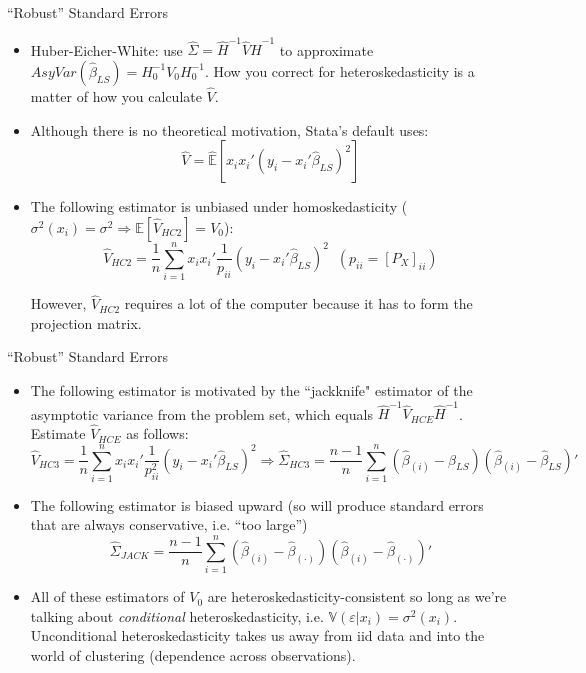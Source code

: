 \documentclass[fleqn, 10pt]{beamer}
\newcommand{\E}{\mathbb{E}}
\begin{document}
\begin{frame}{``Robust'' Standard Errors}
	
	\begin{itemize}
		\item Huber-Eicher-White: use \(\hat{\Sigma} = \hat{H}^{-1} \hat{V} \hat{H}^{-1} \) to approximate $AsyVar(\hat{\beta}_{LS})=H^{-1}_0V_0H^{-1}_0$. How you correct for heteroskedasticity is a matter of how you calculate \( \hat{V} \).
		\item Although there is no theoretical motivation, Stata's default uses:
		\[ \hat{V} = \hat{\E} [x_i x_i' (y_i - x_i' \hat{\beta}_{LS})^2] \]
		\item The following estimator is unbiased under homoskedasticity (\(\sigma^2(x_i) = \sigma^2 \Rightarrow \E[\hat{V}_{HC2}] = V_0 \)):
		\[ \hat{V}_{HC2} = \frac{1}{n} \sum_{i=1}^{n} x_i x_i' \frac{1}{p_{ii}} (y_i - x_i' \hat{\beta}_{LS})^2 \;\; (p_{ii} = [P_X]_{ii}) \]
		
		However, $\hat{V}_{HC2}$ requires a lot of the computer because it has to form the projection matrix. 
	\end{itemize}
	
\end{frame}

\begin{frame}{``Robust'' Standard Errors}
	
	\begin{itemize}
		\item The following estimator is motivated by the ``jackknife" estimator of the asymptotic variance from the problem set, which equals $\hat{H}^{-1}\hat{V}_{HCE}\hat{H}^{-1}$. Estimate $\hat{V}_{HCE}$ as follows:
		\[ \hat{V}_{HC3} = \frac{1}{n} \sum_{i=1}^{n} x_i x_i' \frac{1}{p_{ii}^2} (y_i - x_i' \hat{\beta}_{LS})^2 \Rightarrow \hat{\Sigma}_{HC3} = \frac{n-1}{n} \sum_{i=1}^n \left( \hat{\beta}_{(i)} - \hat{\beta}_{LS} \right) \left( \hat{\beta}_{(i)} - \hat{\beta}_{LS} \right)' \]
		\item The following estimator is biased upward (so will produce standard errors that are always conservative, i.e. ``too large'')
		\[ \hat{\Sigma}_{JACK} = \frac{n-1}{n} \sum_{i=1}^n \left( \hat{\beta}_{(i)} - \hat{\beta}_{(\cdot)} \right) \left( \hat{\beta}_{(i)} - \hat{\beta}_{(\cdot)} \right)' \]
		\item All of these estimators of $V_0$ are heteroskedasticity-consistent so long as we're talking about \textit{conditional} heteroskedasticity, i.e. $\mathbb{V}(\varepsilon|x_i)=\sigma^2(x_i) $. Unconditional heteroskedasticity takes us away from iid data and into the world of clustering (dependence across observations).
	\end{itemize}
	
\end{frame}
\end{document}
